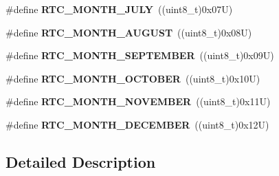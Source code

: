 \begin{DoxyCompactItemize}
\mbox{\label{group___r_t_c___month___date___definitions_gae710e500c34c042a263fcb47edeec29f}} 
\#define {\bfseries R\+T\+C\+\_\+\+M\+O\+N\+T\+H\+\_\+\+J\+U\+LY}~((uint8\+\_\+t)0x07\+U)
\item 
\mbox{\label{group___r_t_c___month___date___definitions_ga4118ea385d30d3f75c2f879faf019f37}} 
\#define {\bfseries R\+T\+C\+\_\+\+M\+O\+N\+T\+H\+\_\+\+A\+U\+G\+U\+ST}~((uint8\+\_\+t)0x08\+U)
\item 
\mbox{\label{group___r_t_c___month___date___definitions_ga2a4d94eeb920cb994cd11e169d086d28}} 
\#define {\bfseries R\+T\+C\+\_\+\+M\+O\+N\+T\+H\+\_\+\+S\+E\+P\+T\+E\+M\+B\+ER}~((uint8\+\_\+t)0x09\+U)
\item 
\mbox{\label{group___r_t_c___month___date___definitions_gab4e8870c5a2fe6fc632d2050d490ef9f}} 
\#define {\bfseries R\+T\+C\+\_\+\+M\+O\+N\+T\+H\+\_\+\+O\+C\+T\+O\+B\+ER}~((uint8\+\_\+t)0x10\+U)
\item 
\mbox{\label{group___r_t_c___month___date___definitions_ga2f04d521214ea447155faff077725212}} 
\#define {\bfseries R\+T\+C\+\_\+\+M\+O\+N\+T\+H\+\_\+\+N\+O\+V\+E\+M\+B\+ER}~((uint8\+\_\+t)0x11\+U)
\item 
\mbox{\label{group___r_t_c___month___date___definitions_gaa2d8ee14bdc0c6b01be7c72b82ae64e5}} 
\#define {\bfseries R\+T\+C\+\_\+\+M\+O\+N\+T\+H\+\_\+\+D\+E\+C\+E\+M\+B\+ER}~((uint8\+\_\+t)0x12\+U)
\end{DoxyCompactItemize}


\subsection{Detailed Description}
